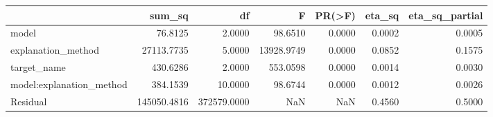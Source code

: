 \begin{tabular}{lrrrrrr}
\toprule
 & sum_sq & df & F & PR(>F) & eta_sq & eta_sq_partial \\
\midrule
model & 76.8125 & 2.0000 & 98.6510 & 0.0000 & 0.0002 & 0.0005 \\
explanation_method & 27113.7735 & 5.0000 & 13928.9749 & 0.0000 & 0.0852 & 0.1575 \\
target_name & 430.6286 & 2.0000 & 553.0598 & 0.0000 & 0.0014 & 0.0030 \\
model:explanation_method & 384.1539 & 10.0000 & 98.6744 & 0.0000 & 0.0012 & 0.0026 \\
Residual & 145050.4816 & 372579.0000 & NaN & NaN & 0.4560 & 0.5000 \\
\bottomrule
\end{tabular}
